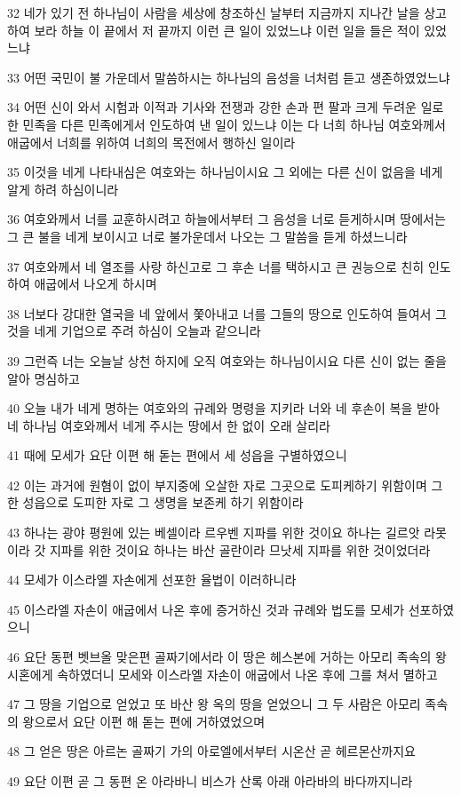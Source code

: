 \par 32 네가 있기 전 하나님이 사람을 세상에 창조하신 날부터 지금까지 지나간 날을 상고하여 보라 하늘 이 끝에서 저 끝까지 이런 큰 일이 있었느냐 이런 일을 들은 적이 있었느냐
\par 33 어떤 국민이 불 가운데서 말씀하시는 하나님의 음성을 너처럼 듣고 생존하였었느냐
\par 34 어떤 신이 와서 시험과 이적과 기사와 전쟁과 강한 손과 편 팔과 크게 두려운 일로 한 민족을 다른 민족에게서 인도하여 낸 일이 있느냐 이는 다 너희 하나님 여호와께서 애굽에서 너희를 위하여 너희의 목전에서 행하신 일이라
\par 35 이것을 네게 나타내심은 여호와는 하나님이시요 그 외에는 다른 신이 없음을 네게 알게 하려 하심이니라
\par 36 여호와께서 너를 교훈하시려고 하늘에서부터 그 음성을 너로 듣게하시며 땅에서는 그 큰 불을 네게 보이시고 너로 불가운데서 나오는 그 말씀을 듣게 하셨느니라
\par 37 여호와께서 네 열조를 사랑 하신고로 그 후손 너를 택하시고 큰 권능으로 친히 인도하여 애굽에서 나오게 하시며
\par 38 너보다 강대한 열국을 네 앞에서 쫓아내고 너를 그들의 땅으로 인도하여 들여서 그것을 네게 기업으로 주려 하심이 오늘과 같으니라
\par 39 그런즉 너는 오늘날 상천 하지에 오직 여호와는 하나님이시요 다른 신이 없는 줄을 알아 명심하고
\par 40 오늘 내가 네게 명하는 여호와의 규례와 명령을 지키라 너와 네 후손이 복을 받아 네 하나님 여호와께서 네게 주시는 땅에서 한 없이 오래 살리라
\par 41 때에 모세가 요단 이편 해 돋는 편에서 세 성읍을 구별하였으니
\par 42 이는 과거에 원혐이 없이 부지중에 오살한 자로 그곳으로 도피케하기 위함이며 그 한 성읍으로 도피한 자로 그 생명을 보존케 하기 위함이라
\par 43 하나는 광야 평원에 있는 베셀이라 르우벤 지파를 위한 것이요 하나는 길르앗 라못이라 갓 지파를 위한 것이요 하나는 바산 골란이라 므낫세 지파를 위한 것이었더라
\par 44 모세가 이스라엘 자손에게 선포한 율법이 이러하니라
\par 45 이스라엘 자손이 애굽에서 나온 후에 증거하신 것과 규례와 법도를 모세가 선포하였으니
\par 46 요단 동편 벳브올 맞은편 골짜기에서라 이 땅은 헤스본에 거하는 아모리 족속의 왕 시혼에게 속하였더니 모세와 이스라엘 자손이 애굽에서 나온 후에 그를 쳐서 멸하고
\par 47 그 땅을 기업으로 얻었고 또 바산 왕 옥의 땅을 얻었으니 그 두 사람은 아모리 족속의 왕으로서 요단 이편 해 돋는 편에 거하였었으며
\par 48 그 얻은 땅은 아르논 골짜기 가의 아로엘에서부터 시온산 곧 헤르몬산까지요
\par 49 요단 이편 곧 그 동편 온 아라바니 비스가 산록 아래 아라바의 바다까지니라


